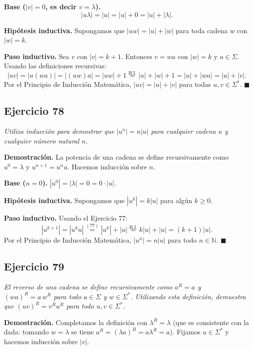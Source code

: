 \medskip
\noindent\textbf{Base ($|v| = 0$, es decir $v = \lambda$).}
\[
|u\lambda| = |u| = |u| + 0 = |u| + |\lambda| .
\]

\noindent\textbf{Hipótesis inductiva.} Supongamos que $|uw| = |u| + |w|$ para toda
cadena $w$ con $|w| = k$.

\medskip
\noindent\textbf{Paso inductivo.} Sea $v$ con $|v| = k + 1$. Entonces $v = wa$ con
$|w| = k$ y $a \in \Sigma$. Usando las definiciones recursivas:
\[
|uv| = |u(wa)| = |(uw)a| = |uw| + 1
\overset{\text{H.I.}}{=} |u| + |w| + 1
= |u| + |wa| = |u| + |v| .
\]
Por el Principio de Inducción Matemática, $|uv| = |u| + |v|$ para todas
$u, v \in \Sigma^*$. $\blacksquare$

\subsection*{Ejercicio 78}

\noindent\textit{Utiliza inducción para demostrar que $|u^n| = n|u|$ para cualquier
    cadena $u$ y cualquier número natural $n$.}

\medskip
\noindent\textbf{Demostración.} La potencia de una cadena se define recursivamente
como $u^0 = \lambda$ y $u^{n+1} = u^n u$. Hacemos inducción sobre $n$.

\medskip
\noindent\textbf{Base ($n = 0$).} $|u^0| = |\lambda| = 0 = 0 \cdot |u|$.

\medskip
\noindent\textbf{Hipótesis inductiva.} Supongamos que $|u^k| = k|u|$ para algún
$k \geq 0$.

\medskip
\noindent\textbf{Paso inductivo.} Usando el Ejercicio 77:
\[
|u^{k+1}| = |u^k u| \overset{(77)}{=} |u^k| + |u|
\overset{\text{H.I.}}{=} k|u| + |u| = (k+1)|u| .
\]
Por el Principio de Inducción Matemática, $|u^n| = n|u|$ para todo
$n \in \mathbb{N}$. $\blacksquare$

\subsection*{Ejercicio 79}

\noindent\textit{El reverso de una cadena se define recursivamente como $a^R = a$ y
    $(wa)^R = a\,w^R$ para todo $a \in \Sigma$ y $w \in \Sigma^*$. Utilizando esta
    definición, demuestra que $(uv)^R = v^R u^R$ para todo $u, v \in \Sigma^*$.}

\medskip
\noindent\textbf{Demostración.} Completamos la definición con $\lambda^R = \lambda$
(que es consistente con la dada: tomando $w = \lambda$ se tiene
$a^R = (\lambda a)^R = a\lambda^R = a$). Fijamos $u \in \Sigma^*$ y hacemos
inducción sobre $|v|$.

